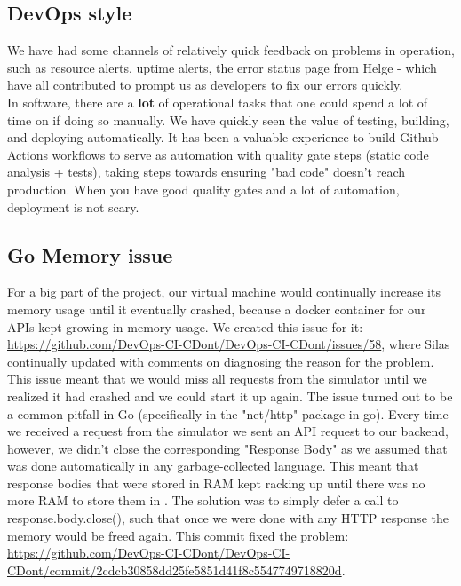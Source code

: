 \subsection{DevOps style}
We have had some channels of relatively quick feedback on problems in operation, such as resource alerts, uptime alerts, the error status page from Helge - which have all contributed to prompt us as developers to fix our errors quickly. \\
In software, there are a \textbf{lot} of operational tasks that one could spend a lot of time on if doing so manually. We have quickly seen the value of testing, building, and deploying automatically. It has been a valuable experience to build Github Actions workflows to serve as automation with quality gate steps (static code analysis + tests), taking steps towards ensuring "bad code" doesn't reach production.  
When you have good quality gates and a lot of automation, deployment is not scary.
 
\subsection{Go Memory issue}
For a big part of the project, our virtual machine would continually increase its memory usage until it eventually crashed, because a docker container for our APIs kept growing in memory usage. We created this issue for it: \url{https://github.com/DevOps-CI-CDont/DevOps-CI-CDont/issues/58}, where Silas continually updated with comments on diagnosing the reason for the problem. \\
This issue meant that we would miss all requests from the simulator until we realized it had crashed and we could start it up again. The issue turned out to be a common pitfall in Go (specifically in the "net/http" package in go). Every time we received a request from the simulator we sent an API request to our backend, however, we didn't close the corresponding "Response Body" as we assumed that was done automatically in any garbage-collected language. This meant that response bodies that were stored in RAM kept racking up until there was no more RAM to store them in \cite{cloudimmunity}. The solution was to simply defer a call to response.body.close(), such that once we were done with any HTTP response the memory would be freed again. 
This commit fixed the problem: \url{https://github.com/DevOps-CI-CDont/DevOps-CI-CDont/commit/2cdcb30858dd25fe5851d41f8c5547749718820d}.

